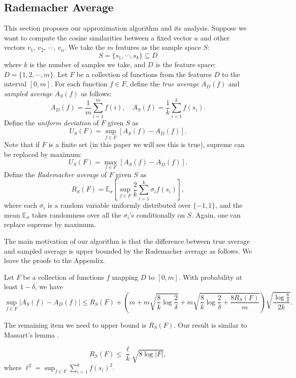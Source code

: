 \documentclass{article}
\begin{document}
\subsection{Rademacher Average}
This section proposes our approximation algorithm and its analysis.
Suppose we want to compute the cosine similarities between a fixed vector $u$ and other vectors $v_1$, $v_2$, $\cdots$, $v_n$. We take the $m$ features as the sample space $S$:
$$S = \{s_1, \cdots, s_k\} \subseteq D$$
where $k$ is the number of samples we take, and $D$ is the feature space: $D = \{1,2,\cdots,m\}$.
Let $F$ be a collection of functions from the features $D$ to the interval $[0, m]$.
For each function $f\in F$, define the \emph{true average} $A_D(f)$ and \emph{sampled average} $A_S(f)$ as follows:
$$A_D(f) = \frac{1}{m} \sum_{i=1}^m f(i),\quad A_S(f) = \frac{1}{k} \sum_{i=1}^k f(s_i).$$
Define the \emph{uniform deviation} \cite{Oneto13} of $F$ given $S$ as
$$U_S(F) = \sup_{f\in F} [ A_S(f) - A_D(f) ].$$
Note that if $F$ is a finite set (in this paper we will see this is true), supreme can be replaced by maximum:
$$U_S(F) = \max_{f\in F} [ A_S(f) - A_D(f) ].$$
Define the \emph{Rademacher average} \cite{Mohri09,BM02,Oneto13} of $F$ given $S$ as
\newcommand{\E}{\mathbb{E}}
$$R_S(F) = \E_\sigma \left[\sup_{f\in F} \frac{2}{k}\sum_{i=1}^k \sigma_i f(s_i) \right],$$
where each $\sigma_i$ is a random variable uniformly distributed over $\{-1, 1\}$, and the mean $\E_\sigma$ takes randomness over all the $\sigma_i$'s conditionally on $S$. Again, one can replace supreme by maximum.

The main motivation of our algorithm is that the difference between true average and sampled average is upper bounded by the Rademacher average as follows.
We leave the proofs to the Appendix.

\begin{theorem}
\label{thm:main}
Let $F$ be a collection of functions $f$ mapping $D$ to $[0,m]$. 
With probability at least $1-\delta$, we have
$$\sup_{f\in F}|A_S(f) - A_D(f)| \leq R_S(F) + \left(m+m\sqrt{\frac{8}{k}\log \frac{2}{\delta}} + m\sqrt{\frac{8}{k}\log \frac{2}{\delta} + \frac{8R_S(F)}{m}}\right)\sqrt{\frac{\log \frac{8}{\delta}}{2k}}.$$
\end{theorem}

The remaining item we need to upper bound is $R_S(F)$. Our result is similar to Massart's lemma \cite{AGO14}.

\begin{theorem}
\label{thm2}
$$R_S(F) \leq \frac{\ell}{k}\sqrt{8\log |F|},$$
where $\ell^2 = \sup_{f\in F}\sum_{i=1}^k f(s_i)^2$.
\end{theorem}
\end{document}
